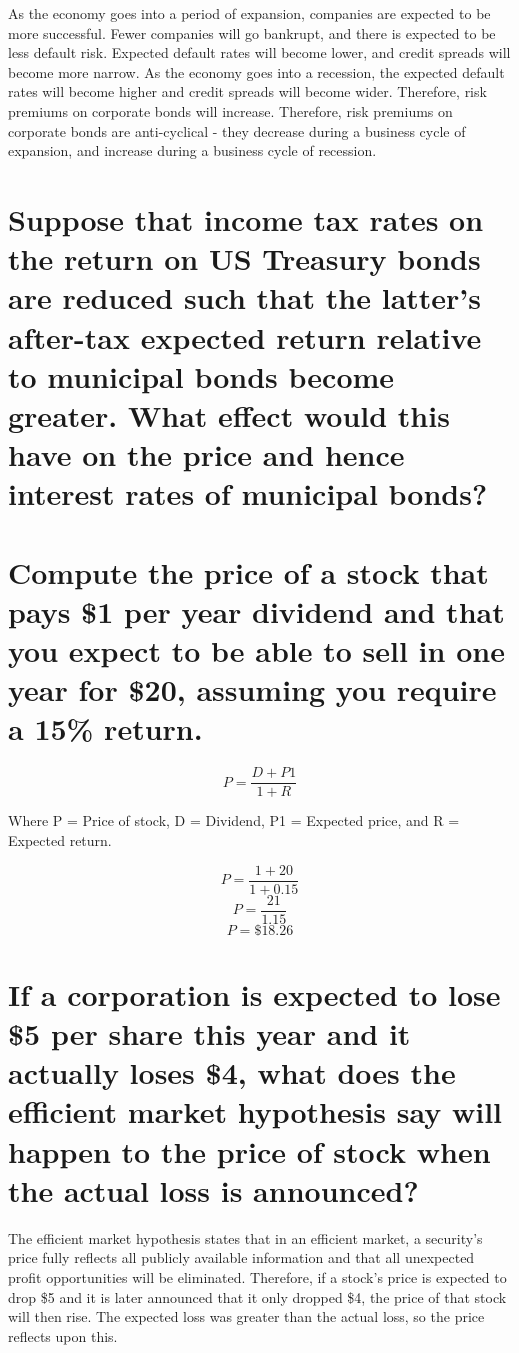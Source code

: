 \documentclass[12pt]{article}
\begin{document}
As the economy goes into a period of expansion, companies are expected
to be more successful. Fewer companies will go bankrupt, and there is
expected to be less default risk. Expected default rates will become
lower, and credit spreads will become more narrow. As the economy goes
into a recession, the expected default rates will become higher and credit
spreads will become wider. Therefore, risk premiums on corporate bonds
will increase.  Therefore, risk premiums on corporate bonds are
anti-cyclical - they decrease during a business cycle of expansion, and
increase during a business cycle of recession.

\section{Suppose that income tax rates on the return on US Treasury bonds are
reduced such that the latter's after-tax expected return relative to municipal
bonds become greater. What effect would this have on the price and hence 
interest rates of municipal bonds?}

\section{Compute the price of a stock that pays \$1 per year dividend and that
you expect to be able to sell in one year for \$20, assuming you require a 
15\% return.}

$$P = \frac{D + P1}{1 + R}$$

Where P = Price of stock, D = Dividend, P1 = Expected price, and R = Expected 
return.

$$P = \frac{1 + 20}{1 + 0.15}$$ 
$$P = \frac{21}{1.15}$$ 
$$P = \$18.26$$

\section{If a corporation is expected to lose \$5 per share this year and it
actually loses \$4, what does the efficient market hypothesis say will happen 
to the price of stock when the actual loss is announced?}

The efficient market hypothesis states that in an efficient market, a
security's price fully reflects all publicly available information and
that all unexpected profit opportunities will be eliminated. Therefore, if
a stock's price is expected to drop \$5 and it is later announced that it
only dropped \$4, the price of that stock will then rise. The expected loss
was greater than the actual loss, so the price reflects upon this.
\end{document}
